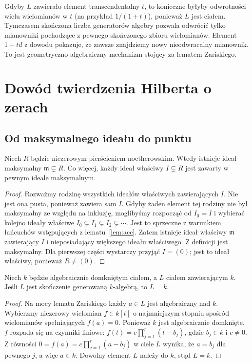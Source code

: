 \begin{uwaga}
Gdyby $L$ zawierało element transcendentalny $t$, to konieczne
byłyby odwrotności wielu wielomianów w $t$ (na przykład
$1/(1+t)$), ponieważ $L$ jest ciałem.
Tymczasem skończona liczba generatorów algebry pozwala
odwrócić tylko mianowniki pochodzące z pewnego skończonego
zbioru wielomianów. Element $1+t d$ z dowodu pokazuje,
że zawsze znajdziemy nowy nieodwracalny mianownik.
To jest geometryczno-algebraiczny mechanizm stojący za lematem Zariskiego.
\end{uwaga}

\section{Dowód twierdzenia Hilberta o zerach}

\subsection{Od maksymalnego ideału do punktu}

\begin{lemat}
\label{lem:maximal-exists}
Niech $R$ będzie niezerowym pierścieniem noetherowskim.
Wtedy istnieje ideał maksymalny $\mathfrak m\subsetneq R$.
Co więcej, każdy ideał właściwy $I\subsetneq R$ jest zawarty
w pewnym ideale maksymalnym.
\end{lemat}
\begin{proof}
Rozważmy rodzinę wszystkich ideałów właściwych zawierających $I$.
Nie jest ona pusta, ponieważ zawiera sam $I$.
Gdyby żaden element tej rodziny nie był maksymalny ze względu na
inkluzję, moglibyśmy rozpocząć od $I_0=I$ i wybierać kolejno
ideały właściwe $I_0\subsetneq I_1\subsetneq I_2\subsetneq\cdots$.
Jest to sprzeczne z warunkiem łańcuchów wstępujących
z lematu~\ref{lem:acc}. Zatem istnieje ideał właściwy
$\mathfrak m$ zawierający $I$ i nieposiadający większego
ideału właściwego. Z definicji jest maksymalny.
Dla pierwszej części wystarczy przyjąć $I=(0)$;
jest to ideał właściwy, ponieważ $R\ne(0)$.
\end{proof}

\begin{lemat}
\label{lem:extension-trivial}
Niech $k$ będzie algebraicznie domkniętym ciałem,
a $L$ ciałem zawierającym $k$.
Jeśli $L$ jest skończenie generowaną $k$-algebrą,
to $L=k$.
\end{lemat}
\begin{proof}
Na mocy lematu Zariskiego każdy $a\in L$ jest algebraiczny
nad $k$. Wybierzmy niezerowy wielomian
$f\in k[t]$ o najmniejszym stopniu spośród wielomianów
spełniających $f(a)=0$. Ponieważ $k$ jest algebraicznie
domknięte, $f$ rozpada się na czynniki liniowe:
$f(t)=c\prod_{j=1}^r(t-b_j)$, gdzie $b_j\in k$ i $c\ne0$.
Z równości
$0=f(a)=c\prod_{j=1}^r(a-b_j)$ w ciele $L$
wynika, że $a=b_j$ dla pewnego $j$, a więc $a\in k$.
Dowolny element $L$ należy do $k$, stąd $L=k$.
\end{proof}

